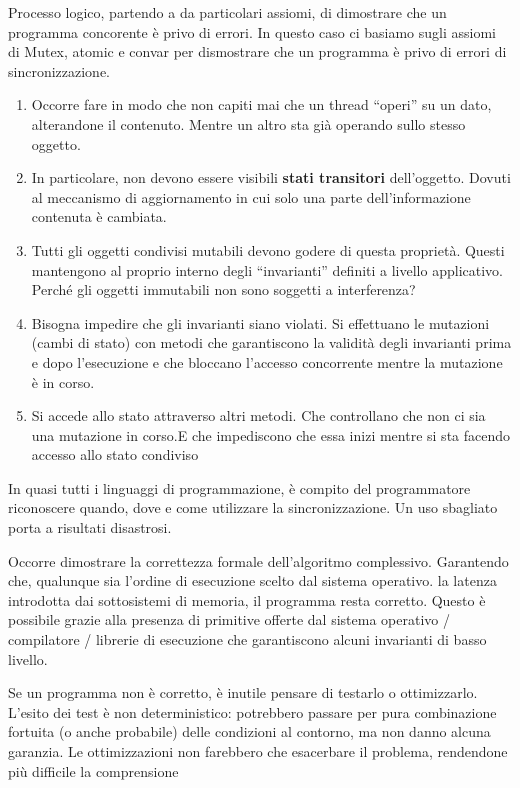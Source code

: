 Processo logico, partendo a da particolari assiomi, di dimostrare che un programma
concorente è privo di errori. In questo caso ci basiamo sugli assiomi di Mutex, atomic e convar per
dismostrare che un programma è privo di errori di sincronizzazione.

\begin{enumerate}
  \item Occorre fare in modo che non capiti mai che un thread ``operi'' su un dato,
        alterandone il contenuto. Mentre un altro sta già operando sullo stesso oggetto.

  \item In particolare, non devono essere visibili \textbf{stati transitori} dell'oggetto. Dovuti
        al meccanismo di aggiornamento in cui solo una parte dell'informazione contenuta
        è cambiata.

  \item Tutti gli oggetti condivisi mutabili devono godere di questa proprietà. Questi
        mantengono al proprio interno degli ``invarianti'' definiti a livello
        applicativo. Perché gli oggetti immutabili non sono soggetti a interferenza?


  \item Bisogna impedire che gli invarianti siano violati. Si effettuano le mutazioni (cambi di stato) con metodi che garantiscono la validità degli invarianti
        prima e dopo l'esecuzione e che bloccano l'accesso concorrente mentre la mutazione è in corso.

  \item Si accede allo stato attraverso altri metodi. Che controllano che non ci sia
        una mutazione in corso.E che impediscono che essa inizi mentre si sta facendo
        accesso allo stato condiviso
\end{enumerate}

In quasi tutti i linguaggi di programmazione, è compito del programmatore
riconoscere quando, dove e come utilizzare la sincronizzazione.  Un uso
sbagliato porta a risultati disastrosi.


Occorre dimostrare la correttezza formale dell'algoritmo complessivo.
Garantendo che, qualunque sia l'ordine di esecuzione scelto dal sistema
operativo. la latenza introdotta dai sottosistemi di memoria, il programma
resta corretto. Questo è possibile grazie alla presenza di primitive offerte
dal sistema operativo / compilatore / librerie di esecuzione che garantiscono
alcuni invarianti di basso livello.

Se un programma non è corretto, è inutile
pensare di testarlo o ottimizzarlo.  L'esito dei test è non deterministico:
potrebbero passare per pura combinazione fortuita (o anche probabile) delle
condizioni al contorno, ma non danno alcuna garanzia.  Le ottimizzazioni non
farebbero che esacerbare il problema, rendendone più difficile la comprensione



